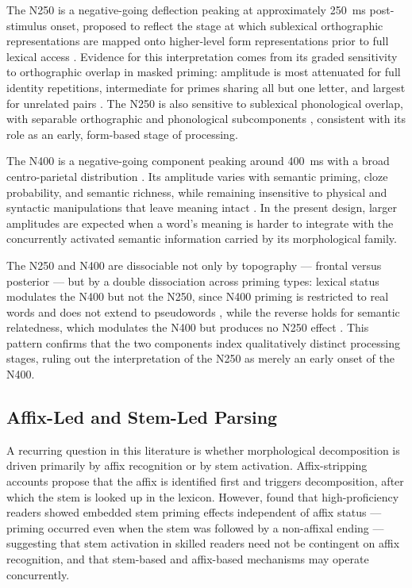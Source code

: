 	The N250 is a negative-going deflection peaking at approximately 250~ms post-stimulus onset, proposed to reflect the stage at which sublexical orthographic representations are mapped onto higher-level form representations prior to full lexical access \citep{holcombTimeCourseVisual2006}. Evidence for this interpretation comes from its graded sensitivity to orthographic overlap in masked priming: amplitude is most attenuated for full identity repetitions, intermediate for primes sharing all but one letter, and largest for unrelated pairs \citep{holcombTimeCourseVisual2006, holcomb_exploring_2007}. The N250 is also sensitive to sublexical phonological overlap, with separable orthographic and phonological subcomponents \citep{graingerTimeCourseOrthographic2006}, consistent with its role as an early, form-based stage of processing.

	The N400 is a negative-going component peaking around 400~ms with a broad centro-parietal distribution \citep{kutasReadingSenselessSentences1980}. Its amplitude varies with semantic priming, cloze probability, and semantic richness, while remaining insensitive to physical and syntactic manipulations that leave meaning intact \citep{kutasThirtyYearsCounting2011}. In the present design, larger amplitudes are expected when a word's meaning is harder to integrate with the concurrently activated semantic information carried by its morphological family.

	The N250 and N400 are dissociable not only by topography --- frontal versus posterior \citep{holcombTimeCourseVisual2006} --- but by a double dissociation across priming types: lexical status modulates the N400 but not the N250, since N400 priming is restricted to real words and does not extend to pseudowords \citep{kiyonagaMaskedCrossmodalRepetition2007}, while the reverse holds for semantic relatedness, which modulates the N400 but produces no N250 effect \citep{graingerWatchingWordGo2009}. This pattern confirms that the two components index qualitatively distinct processing stages, ruling out the interpretation of the N250 as merely an early onset of the N400.

	\subsection{Affix-Led and Stem-Led Parsing}

	A recurring question in this literature is whether morphological decomposition is driven primarily by affix recognition or by stem activation. Affix-stripping accounts \citep{taft_lexical_1975, rastleMorphologicalDecompositionBased2008} propose that the affix is identified first and triggers decomposition, after which the stem is looked up in the lexicon. However, \citet{beyersmannEmbeddedStemPriming2016} found that high-proficiency readers showed embedded stem priming effects independent of affix status --- priming occurred even when the stem was followed by a non-affixal ending --- suggesting that stem activation in skilled readers need not be contingent on affix recognition, and that stem-based and affix-based mechanisms may operate concurrently.

